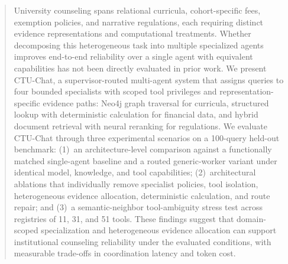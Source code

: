 \begin{abstract}
University counseling spans relational curricula, cohort-specific fees, exemption policies, and narrative regulations, each requiring distinct evidence representations and computational treatments. Whether decomposing this heterogeneous task into multiple specialized agents improves end-to-end reliability over a single agent with equivalent capabilities has not been directly evaluated in prior work. We present CTU-Chat, a supervisor-routed multi-agent system that assigns queries to four bounded specialists with scoped tool privileges and representation-specific evidence paths: Neo4j graph traversal for curricula, structured lookup with deterministic calculation for financial data, and hybrid document retrieval with neural reranking for regulations. We evaluate CTU-Chat through three experimental scenarios on a 100-query held-out benchmark: (1)~an architecture-level comparison against a functionally matched single-agent baseline and a routed generic-worker variant under identical model, knowledge, and tool capabilities; (2)~architectural ablations that individually remove specialist policies, tool isolation, heterogeneous evidence allocation, deterministic calculation, and route repair; and (3)~a semantic-neighbor tool-ambiguity stress test across registries of 11, 31, and 51 tools. %
These findings suggest that domain-scoped specialization and heterogeneous evidence allocation can support institutional counseling reliability under the evaluated conditions, with measurable trade-offs in coordination latency and token cost.

\end{abstract}
